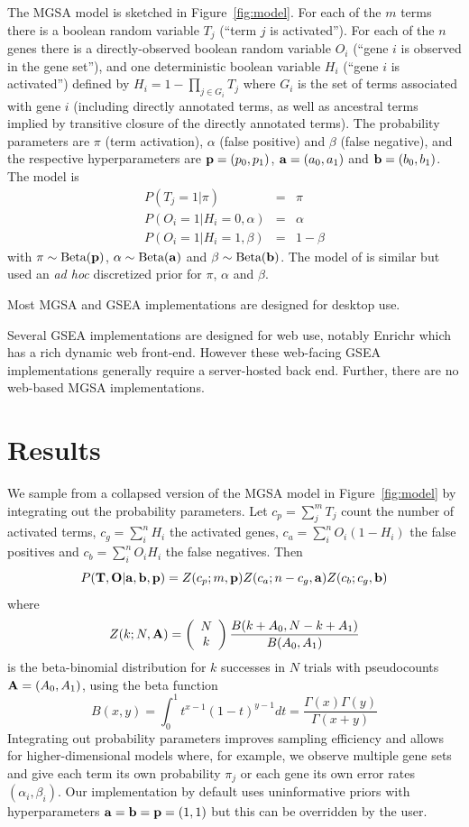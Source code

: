 The MGSA model is sketched in Figure~\ref{fig:model}.
For each of the $m$ terms there
is a boolean random variable
$T_j$ (``term $j$ is activated'').
For each of the $n$ genes there is a directly-observed boolean random variable
$O_i$ (``gene $i$ is observed in the gene set''),
and one deterministic boolean variable
$H_i$ (``gene $i$ is activated'')
defined by $H_i = 1 - \prod_{j \in G_i} T_j$
where $G_i$ is the set of terms associated with gene $i$
(including directly annotated terms, as well as ancestral terms implied by transitive closure of the directly annotated terms).
The probability parameters are $\pi$ (term activation), $\alpha$ (false positive) and $\beta$ (false negative),
and the respective hyperparameters are ${\bf p}=(p_0,p_1)$, ${\bf a}=(a_0,a_1)$ and ${\bf b}=(b_0,b_1)$.
The model is
\begin{eqnarray*}
P(T_j=1|\pi) & = & \pi \\
P(O_i=1|H_i=0,\alpha) & = & \alpha \\
P(O_i=1|H_i=1,\beta) & = & 1-\beta
\end{eqnarray*}
with
$\pi \sim \mbox{Beta}({\bf p})$,
$\alpha \sim \mbox{Beta}({\bf a})$ and
$\beta \sim \mbox{Beta}({\bf b})$.
The model of \cite{pmid20172960} is similar but used an
{\em ad hoc} discretized prior for $\pi$, $\alpha$ and $\beta$.

Most MGSA and GSEA implementations are designed for desktop use.

Several GSEA implementations are designed for web use, notably Enrichr \citep{pmid23586463,pmid25971742,pmid27141961}
which has a rich dynamic web front-end.
However these web-facing GSEA implementations generally require a server-hosted back end.
Further, there are no web-based MGSA implementations.

\section*{Results}

We sample from a collapsed version of the MGSA model in Figure~\ref{fig:model} by integrating out the probability parameters.
Let $c_p = \sum_j^m T_j$ count the number of activated terms,
$c_g = \sum_i^n H_i$ the activated genes,
$c_a = \sum_i^n O_i(1-H_i)$ the false positives and
$c_b = \sum_i^n O_i H_i$ the false negatives.
Then
\[
P({\bf T},{\bf O}|{\bf a},{\bf b},{\bf p}) =
Z(c_p;m,{\bf p})
Z(c_a;n-c_g,{\bf a})
Z(c_b;c_g,{\bf b})
\]
where
\[
Z(k;N,{\bf A}) =
\left( \begin{array}{c} N \\ k \end{array} \right)
\frac{B(k+A_0,N-k+A_1)}{B(A_0,A_1)}
\]
is the beta-binomial distribution for $k$ successes in $N$ trials with pseudocounts ${\bf A}=(A_0,A_1)$,
using the beta function
\[
B(x,y) = \int_0^1 t^{x-1}(1-t)^{y-1} dt = \frac{\Gamma(x)\Gamma(y)}{\Gamma(x+y)}
\]
Integrating out probability parameters improves sampling efficiency
and allows for higher-dimensional models where, for example, we observe multiple gene sets
and give each term its own probability $\pi_j$
or each gene its own error rates $(\alpha_i, \beta_i)$.
Our implementation by default uses uninformative priors with hyperparameters ${\bf a}={\bf b}={\bf p}=(1,1)$
but this can be overridden by the user.

